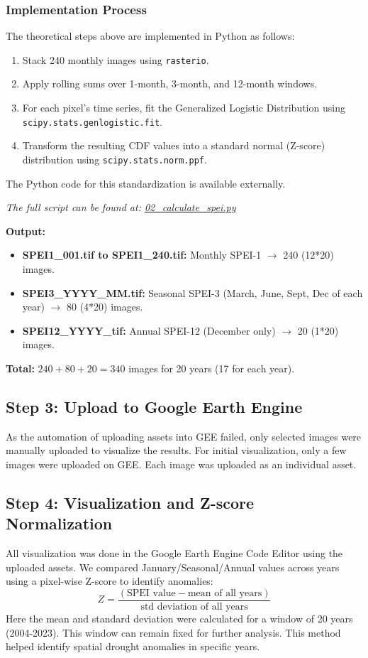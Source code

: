 \documentclass[12pt, a4paper]{article}
\begin{document}
\subsubsection{Implementation Process}
The theoretical steps above are implemented in Python as follows:
\begin{enumerate}
    \item Stack 240 monthly images using \texttt{rasterio}.
    \item Apply rolling sums over 1-month, 3-month, and 12-month windows.
    \item For each pixel's time series, fit the Generalized Logistic Distribution using \texttt{scipy.stats.genlogistic.fit}.
    \item Transform the resulting CDF values into a standard normal (Z-score) distribution using \texttt{scipy.stats.norm.ppf}.
\end{enumerate}

The Python code for this standardization is available externally.
\begin{center}
    \textit{The full script can be found at: \href{https://github.com/Actuallyanonymous/spei-drought-analysis-pipeline/blob/main/scripts/02_calculate_spei.py}{02\_calculate\_spei.py}}
\end{center}


\textbf{Output:}
\begin{itemize}
    \item \textbf{SPEI1\_001.tif to SPEI1\_240.tif:} Monthly SPEI-1 $\rightarrow$ 240 (12*20) images.
    \item \textbf{SPEI3\_YYYY\_MM.tif:} Seasonal SPEI-3 (March, June, Sept, Dec of each year) $\rightarrow$ 80 (4*20) images.
    \item \textbf{SPEI12\_YYYY\_tif:} Annual SPEI-12 (December only) $\rightarrow$ 20 (1*20) images.
\end{itemize}
\textbf{Total:} $240 + 80 + 20 = 340$ images for 20 years (17 for each year).

\subsection{Step 3: Upload to Google Earth Engine}
As the automation of uploading assets into GEE failed, only selected images were manually uploaded to visualize the results. For initial visualization, only a few images were uploaded on GEE. Each image was uploaded as an individual asset.

\subsection{Step 4: Visualization and Z-score Normalization}
All visualization was done in the Google Earth Engine Code Editor using the uploaded assets. We compared January/Seasonal/Annual values across years using a pixel-wise Z-score to identify anomalies:
\[ Z = \frac{(\text{SPEI value} - \text{mean of all years})}{\text{std deviation of all years}} \]
Here the mean and standard deviation were calculated for a window of 20 years (2004-2023). This window can remain fixed for further analysis. This method helped identify spatial drought anomalies in specific years.
\end{document}
